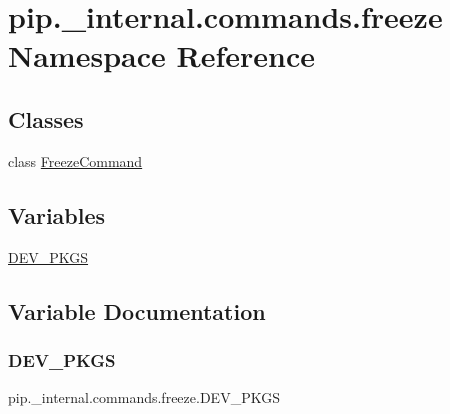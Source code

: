 \hypertarget{namespacepip_1_1__internal_1_1commands_1_1freeze}{}\section{pip.\+\_\+internal.\+commands.\+freeze Namespace Reference}
\label{namespacepip_1_1__internal_1_1commands_1_1freeze}
\subsection*{Classes}
\begin{DoxyCompactItemize}
\item 
class \hyperlink{classpip_1_1__internal_1_1commands_1_1freeze_1_1FreezeCommand}{Freeze\+Command}
\end{DoxyCompactItemize}
\subsection*{Variables}
\begin{DoxyCompactItemize}
\item 
\hyperlink{namespacepip_1_1__internal_1_1commands_1_1freeze_ae3ff09348d22be82c48a2ab6227bf3cb}{D\+E\+V\+\_\+\+P\+K\+GS}
\end{DoxyCompactItemize}


\subsection{Variable Documentation}
\mbox{\label{namespacepip_1_1__internal_1_1commands_1_1freeze_ae3ff09348d22be82c48a2ab6227bf3cb}} 
\subsubsection{\texorpdfstring{D\+E\+V\+\_\+\+P\+K\+GS}{DEV\_PKGS}}
{\footnotesize\ttfamily pip.\+\_\+internal.\+commands.\+freeze.\+D\+E\+V\+\_\+\+P\+K\+GS}

